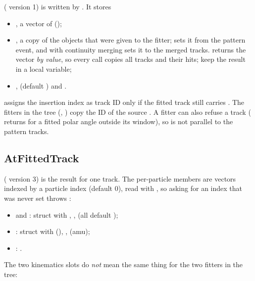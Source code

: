  ( version 1) is written by . It stores
\begin{itemize}
\item {}, a vector of 
  ();
\item {}, a copy of the  objects that were given to the fitter;
   sets it from the pattern event, and  with
  continuity merging sets it to the merged tracks.  returns the vector
  \emph{by value}, so every call copies all tracks and their hits; keep the result in a local variable;
\item {},  (default ) and .
\end{itemize}
 assigns the insertion index as track ID only if the fitted track still carries
. The fitters in the tree (, ) copy the ID of the source
. A fitter can also refuse a track ( returns  for a fitted
polar angle outside its window), so  is not parallel to the pattern tracks.

\subsection{AtFittedTrack}

 ( version 3) is the result for one track. The per-particle members are
vectors indexed by a particle index (default 0), read with , so asking for an index that
was never set throws :

\begin{itemize}
\item {} and : struct  with
  , ,  (all default );
\item {}: struct  with  (),
  ,  (amu);
\item {}: .
\end{itemize}

The two kinematics slots do \emph{not} mean the same thing for the two fitters in the tree:

